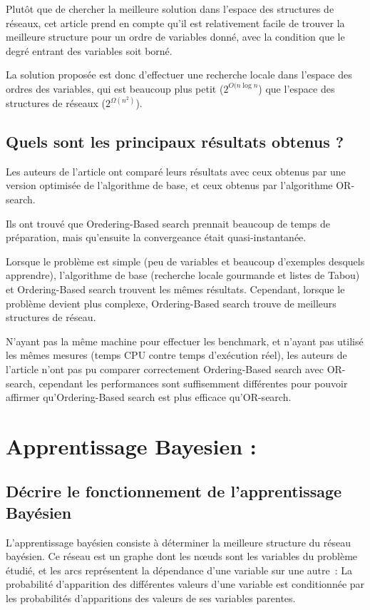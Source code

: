 \documentclass[french,a4paper]{article}
\begin{document}
Plutôt que de chercher la meilleure solution dans l'espace des
structures de réseaux, cet article prend en compte qu'il est
relativement facile de trouver la meilleure structure pour un ordre de
variables donné, avec la condition que le degré entrant des variables
soit borné.

La solution proposée est donc d'effectuer une recherche locale dans
l'espace des ordres des variables, qui est beaucoup plus petit
($2^{O(n \log n}$) que l'espace des structures de réseaux ($2^{\Omega(n^2)}$).

\subsection{Quels sont les principaux résultats obtenus ?}

Les auteurs de l'article ont comparé leurs résultats avec ceux obtenus
par une version optimisée de l'algorithme de base, et ceux obtenus par
l'algorithme OR-search.

Ils ont trouvé que Oredering-Based search prennait beaucoup de temps
de préparation, mais qu'ensuite la convergeance était
quasi-instantanée.

Lorsque le problème est simple (peu de variables et beaucoup
d'exemples desquels apprendre), l'algorithme de base (recherche locale
gourmande et listes de Tabou) et Ordering-Based search trouvent les
mêmes résultats. Cependant, lorsque le problème devient plus complexe,
Ordering-Based search trouve de meilleurs structures de réseau.

N'ayant pas la même machine pour effectuer les benchmark, et n'ayant
pas utilisé les mêmes mesures (temps CPU contre temps d'exécution
réel), les auteurs de l'article n'ont pas pu comparer correctement
Ordering-Based search avec OR-search, cependant les performances sont
suffisemment différentes pour pouvoir affirmer qu'Ordering-Based
search est plus efficace qu'OR-search.

\section{Apprentissage Bayesien :}
\subsection{Décrire le fonctionnement de l'apprentissage Bayésien}

L'apprentissage bayésien consiste à déterminer la meilleure structure
du réseau bayésien. Ce réseau est un graphe dont les nœuds sont les
variables du problème étudié, et les arcs représentent la dépendance
d'une variable sur une autre~: La probabilité d'apparition des
différentes valeurs d'une variable est conditionnée par les
probabilités d'apparitions des valeurs de ses variables parentes.
\end{document}
